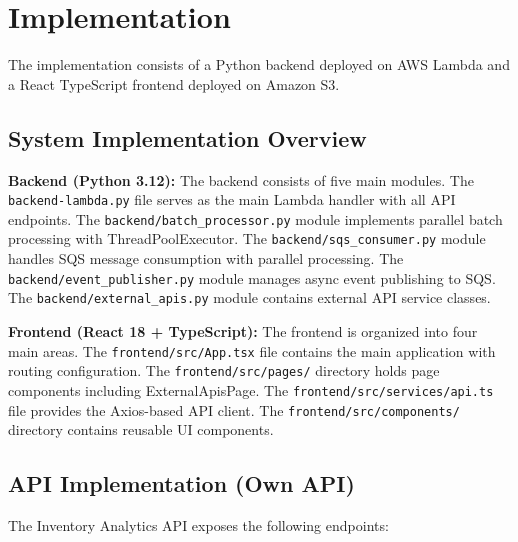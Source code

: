 \documentclass[conference]{IEEEtran}
\begin{document}
\section{Implementation}
\label{sec:implementation}

The implementation consists of a Python backend deployed on AWS Lambda and a React TypeScript frontend deployed on Amazon S3.

\subsection{System Implementation Overview}

\textbf{Backend (Python 3.12):} The backend consists of five main modules. The \texttt{backend-lambda.py} file serves as the main Lambda handler with all API endpoints. The \texttt{backend/batch\_processor.py} module implements parallel batch processing with ThreadPoolExecutor. The \texttt{backend/sqs\_consumer.py} module handles SQS message consumption with parallel processing. The \texttt{backend/event\_publisher.py} module manages async event publishing to SQS. The \texttt{backend/external\_apis.py} module contains external API service classes.

\textbf{Frontend (React 18 + TypeScript):} The frontend is organized into four main areas. The \texttt{frontend/src/App.tsx} file contains the main application with routing configuration. The \texttt{frontend/src/pages/} directory holds page components including ExternalApisPage. The \texttt{frontend/src/services/api.ts} file provides the Axios-based API client. The \texttt{frontend/src/components/} directory contains reusable UI components.

\subsection{API Implementation (Own API)}

The Inventory Analytics API exposes the following endpoints:
\end{document}
